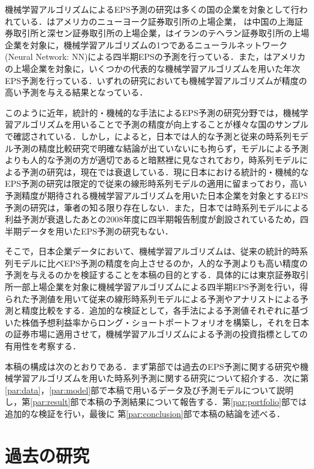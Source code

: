 \documentclass[a4paper，11pt]{jsarticle}
\begin{document}
機械学習アルゴリズムによるEPS予測の研究は多くの国の企業を対象として行われている．\cite{zhang2004neural}はアメリカのニューヨーク証券取引所の上場企業，\cite*{cao2009forecasting} は中国の上海証券取引所と深セン証券取引所の上場企業，\cite{etemadi2015earnings}はイランのテヘラン証券取引所の上場企業を対象に，機械学習アルゴリズムの1つであるニューラルネットワーク(Neural Network: NN)による四半期EPSの予測を行っている．また，\cite*{cao2020fundamental}はアメリカの上場企業を対象に，いくつかの代表的な機械学習アルゴリズムを用いた年次EPS予測を行っている．いずれの研究においても機械学習アルゴリズムが精度の高い予測を与える結果となっている．

このように近年，統計的・機械的な手法によるEPS予測の研究分野では，機械学習アルゴリズムを用いることで予測の精度が向上することが様々な国のサンプルで確認されている．しかし，\cite{ota2006}によると，日本では人的な予測と従来の時系列モデル予測の精度比較研究で明確な結論が出ていないにも拘らず，モデルによる予測よりも人的な予測の方が適切であると暗黙裡に見なされており，時系列モデルによる予測の研究は，現在では衰退している．現に日本における統計的・機械的なEPS予測の研究は限定的で従来の線形時系列モデルの適用に留まっており，高い予測精度が期待される機械学習アルゴリズムを用いた日本企業を対象とするEPS予測の研究は，筆者の知る限り存在しない．また，日本では時系列モデルによる利益予測が衰退したあとの2008年度に四半期報告制度が創設されているため，四半期データを用いたEPS予測の研究もない．

そこで，日本企業データにおいて、機械学習アルゴリズムは、従来の統計的時系列モデルに比べEPS予測の精度を向上させるのか，人的な予測よりも高い精度の予測を与えるのかを検証することを本稿の目的とする．具体的には東京証券取引所一部上場企業を対象に機械学習アルゴリズムによる四半期EPS予測を行い，得られた予測値を用いて従来の線形時系列モデルによる予測やアナリストによる予測と精度比較をする．追加的な検証として，各手法による予測値それぞれに基づいた株価予想利益率からロング・ショートポートフォリオを構築し，それを日本の証券市場に適用させて，機械学習アルゴリズムによる予測の投資指標としての有用性を考察する．

本稿の構成は次のとおりである．まず第\ref{par:litrev}部では過去のEPS予測に関する研究や機械学習アルゴリズムを用いた時系列予測に関する研究について紹介する．次に第\ref{par:data}，\ref{par:model}部で本稿で用いるデータ及び予測モデルについて説明し，第\ref{par:result}部で本稿の予測結果について報告する．第\ref{par:portfolio}部では追加的な検証を行い，最後に 第\ref{par:conclusion}部で本稿の結論を述べる．

\part{過去の研究} \label{par:litrev}
\end{document}
